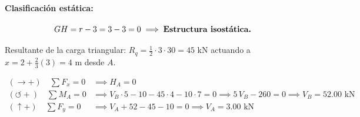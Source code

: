 \paragraph{Clasificación estática:}

\[

    GH = r - 3 = 3 - 3 = 0 \implies \text{\textbf{Estructura isostática.}}

\]




Resultante de la carga triangular: $R_q = \frac{1}{2} \cdot 3 \cdot 30 = 45\text{ kN}$ actuando a $x = 2 + \frac{2}{3}(3) = 4\text{ m}$ desde $A$.

\begin{align}

    (\rightarrow +) \quad \sum F_x = 0      & \implies \boxed{H_A = 0}                                                                                                 \\

    (\circlearrowleft +) \quad \sum M_A = 0 & \implies V_B \cdot 5 - 10 - 45 \cdot 4 - 10 \cdot 7 = 0 \implies 5\,V_B - 260 = 0 \implies \boxed{V_B = 52.00\text{ kN}} \\

    (\uparrow +) \quad \sum F_y = 0         & \implies V_A + 52 - 45 - 10 = 0 \implies \boxed{V_A = 3.00\text{ kN}}

\end{align}






